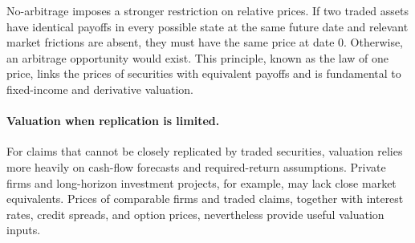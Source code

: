 No-arbitrage imposes a stronger restriction on relative prices. If two traded assets have identical payoffs in every possible state at the same future date and relevant market frictions are absent, they must have the same price at date 0. Otherwise, an arbitrage opportunity would exist. This principle, known as the law of one price, links the prices of securities with equivalent payoffs and is fundamental to fixed-income and derivative valuation.

\paragraph{Valuation when replication is limited.}
For claims that cannot be closely replicated by traded securities, valuation relies more heavily on cash-flow forecasts and required-return assumptions. Private firms and long-horizon investment projects, for example, may lack close market equivalents. Prices of comparable firms and traded claims, together with interest rates, credit spreads, and option prices, nevertheless provide useful valuation inputs.

